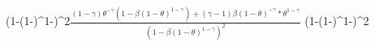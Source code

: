 {(1-\beta(1-\theta)^{1-\gamma})^2}$
\frac{(1-\gamma)\theta^{-\gamma}(1-\beta(1-\theta)^{1-\gamma})+(\gamma-1)\beta(1-\theta)^{-\gamma}*\theta^{1-\gamma}}
{(1-\beta(1-\theta)^{1-\gamma})^2}$
{(1-\beta(1-\theta)^{1-\gamma})^2}